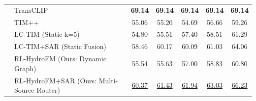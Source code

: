 \begin{table}[t]
{\begin{tabular}{llccccc}
 & TransCLIP & \textbf{69.14} & \textbf{69.14} & \textbf{69.14} & \textbf{69.14} & \textbf{69.14} \\
 & TIM++ & 55.06 & 55.20 & 54.69 & 56.66 & 59.26 \\
 & LC-TIM (Static k=5) & 54.80 & 55.51 & 57.40 & 58.51 & 61.29 \\
 & LC-TIM+SAR (Static Fusion) & 58.46 & 60.17 & 60.09 & 61.03 & 64.06 \\
 & RL-HydroFM (Ours: Dynamic Graph) & 55.54 & 55.63 & 57.00 & 58.83 & 60.80 \\
 & RL-HydroFM+SAR (Ours: Multi-Source Router) & \underline{60.37} & \underline{61.43} & \underline{61.94} & \underline{63.03} & \underline{66.23} \\
\midrule
\bottomrule
\end{tabular}
}
\end{table}
